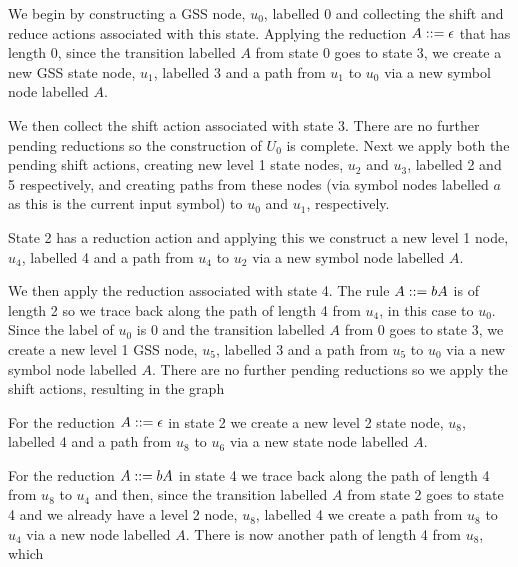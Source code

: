 We begin by constructing a GSS node, $u_0$, labelled 0 and collecting
the shift and reduce actions associated with this state. Applying
the reduction $A::=\epsilon$ that has length 0, since 
the transition labelled $A$ from state 0
goes to state 3, we create a new GSS state node, $u_1$, labelled 3
and a path from $u_1$ to $u_0$ via a new symbol node labelled $A$.
\begin{center}
\footnotesize

\end{center}
We then collect the shift action associated with state 3. There are no
further pending reductions so the construction of $U_0$ is complete.
Next we apply both the pending shift actions, creating new level 1
state nodes, $u_2$ and $u_3$, labelled 2 and 5 respectively, and
creating paths from these nodes (via symbol nodes labelled $a$ as this
is the current input symbol) to $u_0$ and $u_1$, respectively.
\begin{center}
\footnotesize

\end{center}
State 2 has a reduction action and applying this we construct a new
level 1 node, $u_4$, labelled 4 and a path from $u_4$ to $u_2$ via a
new symbol node labelled $A$.
\begin{center}
\footnotesize

\end{center}
We then apply the reduction associated with state 4. The rule $A::=
bA$ is of length 2 so we trace back along the path of length 4 from
$u_4$, in this case to $u_0$. Since the label of $u_0$ is 0 and the
transition labelled $A$ from 0 goes to state 3, we create a new level
1 GSS node, $u_5$, labelled 3 and a path from $u_5$ to $u_0$ via a new
symbol node labelled $A$. There are no further pending reductions so we
apply the shift actions, resulting in the graph
\begin{center}
\footnotesize

\end{center}
For the reduction $A::=\epsilon$ in state 2 we create a new level 2
state node, $u_8$, labelled 4 and a path from $u_8$ to $u_6$ via a new
state node labelled $A$.
\begin{center}
\footnotesize

\end{center}
For the reduction $A::= bA$ in state 4 we trace back along the path
of length 4 from $u_8$ to $u_4$ and then, since the transition labelled
$A$ from state 2 goes to state 4 and we already have a level 2 node,
$u_8$, labelled 4 we create a path from $u_8$ to $u_4$ via a new node
labelled $A$. There is now another path of length 4 from $u_8$, which
